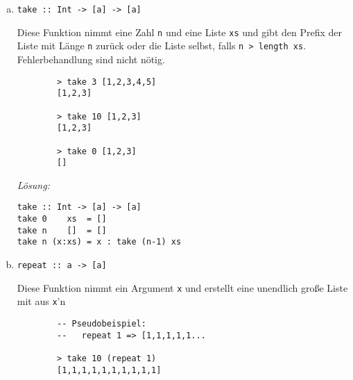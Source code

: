 \documentclass{article}
\begin{document}
\begin{enumerate} [a)]
    \begin{verbatim}
        > at [1,2,3] 0
        1

        > at "hallo" 4
        'o'
    \end{verbatim}

    \textit{Lösung:}
    \begin{mdframed}[backgroundcolor=bg]
        \begin{verbatim}
at :: [a] -> Int -> a
at (x:_)  0 = x
at (x:xs) n = at xs (n-1)
        \end{verbatim}
    \end{mdframed}

    \item \begin{verbatim}
take :: Int -> [a] -> [a]
          \end{verbatim}
    Diese Funktion nimmt eine Zahl \texttt{n} und eine Liste \texttt{xs} und gibt den Prefix der Liste mit Länge \texttt{n} zurück
    oder die Liste selbst, falls \texttt{n > length xs}. Fehlerbehandlung sind nicht nötig. \\

    \begin{verbatim}
        > take 3 [1,2,3,4,5]
        [1,2,3]
       
        > take 10 [1,2,3]
        [1,2,3]
       
        > take 0 [1,2,3]
        []
    \end{verbatim}
    \textit{Lösung:}
    \begin{mdframed}[backgroundcolor=bg]
        \begin{verbatim}
take :: Int -> [a] -> [a]
take 0    xs  = []
take n    []  = []
take n (x:xs) = x : take (n-1) xs
        \end{verbatim}
    \end{mdframed}

\newpage

    \item \begin{verbatim}
repeat :: a -> [a]
          \end{verbatim}
    Diese Funktion nimmt ein Argument \texttt{x} und erstellt eine unendlich große Liste mit aus \texttt{x}'n
    \begin{verbatim}
        -- Pseudobeispiel:
        --   repeat 1 => [1,1,1,1,1...

        > take 10 (repeat 1)
        [1,1,1,1,1,1,1,1,1,1]


\end{verbatim}
\end{enumerate}
\end{document}
